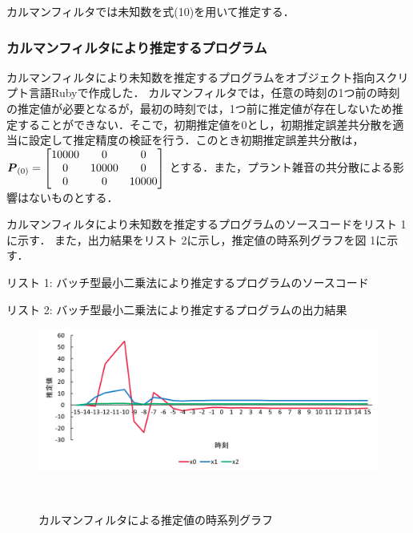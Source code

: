\documentclass[a4paper]{jarticle}
\begin{document}
カルマンフィルタでは未知数を式(10)を用いて推定する．


\newpage
\subsubsection{カルマンフィルタにより推定するプログラム}
カルマンフィルタにより未知数を推定するプログラムをオブジェクト指向スクリプト言語Rubyで作成した．
カルマンフィルタでは，任意の時刻の1つ前の時刻の推定値が必要となるが，最初の時刻では，1つ前に推定値が存在しないため推定することができない．そこで，初期推定値を0とし，初期推定誤差共分散を適当に設定して推定精度の検証を行う．このとき初期推定誤差共分散は，
\(
\mbox{\boldmath $P$}_{(0)} =
\begin{bmatrix}
{10000} & 0 & 0\\
0 & {10000} & 0\\
0 & 0 & {10000} \\ 
\end{bmatrix} 
\)
とする．また，プラント雑音の共分散による影響はないものとする．

カルマンフィルタにより未知数を推定するプログラムのソースコードをリスト 1に示す．
また，出力結果をリスト 2に示し，推定値の時系列グラフを図 1に示す．

\vspace{3mm}
\begin{center}
リスト 1: バッチ型最小二乗法により推定するプログラムのソースコード
\begin{small}
\vspace{1mm}
\end{small}
\vspace{3mm}
\end{center}

\begin{center}
リスト 2: バッチ型最小二乗法により推定するプログラムの出力結果
\begin{small}
\vspace{1mm}
\end{small}
\end{center}
\begin{figure}[!h]
  \centering
  \includegraphics[width=16cm]{kalman1.png}
  \caption{カルマンフィルタによる推定値の時系列グラフ}
　\label{graph}
\end{figure}
\end{document}
